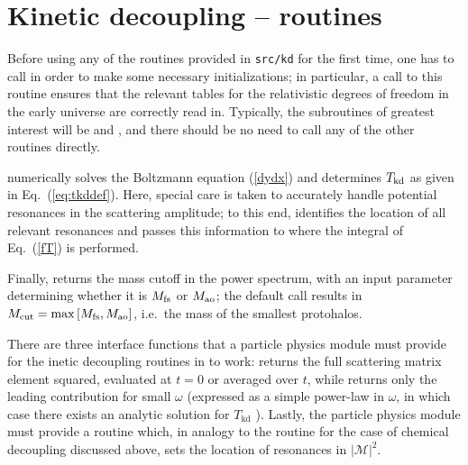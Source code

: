 \section{Kinetic decoupling -- routines}

Before using any of the routines provided in {\tt src/kd} for the first time, one has to 
call  in order to make some necessary initializations; in particular, a call
to this routine ensures that the relevant tables for the relativistic degrees of freedom in the
early universe are correctly read in. Typically, the subroutines of greatest interest will be 
 and , and there should be no need to call any of the other routines directly.

 numerically solves the Boltzmann equation (\ref{dydx}) and determines
$T_{\rm kd}$ as given in Eq.~(\ref{eq:tkddef}). Here, special care is taken to 
accurately handle potential resonances in the scattering amplitude; to this end, 
 identifies the location of all relevant resonances and passes this
information to  where the integral of Eq.~(\ref{fT}) is performed.

Finally,  returns the mass cutoff in the power spectrum, with an input parameter 
determining whether it is $M_{\rm fs}$ or $M_{\rm ao}$; the default call results in 
$M_{\rm cut}=\max\left[M_{\rm fs},M_{\rm ao}\right]$, i.e.~the mass of 
the smallest protohalos.

There are three interface functions that a particle physics module must provide for the inetic
decoupling routines in  to work:  returns the full scattering matrix element squared, evaluated 
at $t=0$ or averaged over $t$, while  returns only the leading contribution
for small $\omega$ (expressed as a simple power-law in $\omega$, in which case there exists an
analytic solution for $T_\mathrm{kd}$ \cite{Bringmann:2006mu}). Lastly, the particle physics
module must provide a routine  which, in analogy to the routine  
for the case of chemical decoupling
discussed above, sets the location of resonances in $\left|\mathcal{M}\right|^2$.